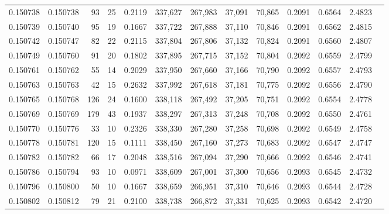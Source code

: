 \begin{tabular}{rrrrrrrrrrrrr}
0.150738 & 0.150738 &    93 &  25 &                                     0.2119 & 337,627 & 267,983 &  37,091 &  70,865 & 0.2091 & 0.6564 & 2.4823 \\
0.150739 & 0.150740 &    95 &  19 &                                     0.1667 & 337,722 & 267,888 &  37,110 &  70,846 & 0.2091 & 0.6562 & 2.4815 \\
0.150742 & 0.150747 &    82 &  22 &                                     0.2115 & 337,804 & 267,806 &  37,132 &  70,824 & 0.2091 & 0.6560 & 2.4807 \\
0.150749 & 0.150760 &    91 &  20 &                                     0.1802 & 337,895 & 267,715 &  37,152 &  70,804 & 0.2092 & 0.6559 & 2.4799 \\
0.150761 & 0.150762 &    55 &  14 &                                     0.2029 & 337,950 & 267,660 &  37,166 &  70,790 & 0.2092 & 0.6557 & 2.4793 \\
0.150763 & 0.150763 &    42 &  15 &                                     0.2632 & 337,992 & 267,618 &  37,181 &  70,775 & 0.2092 & 0.6556 & 2.4790 \\
0.150765 & 0.150768 &   126 &  24 &                                     0.1600 & 338,118 & 267,492 &  37,205 &  70,751 & 0.2092 & 0.6554 & 2.4778 \\
0.150769 & 0.150769 &   179 &  43 &                                     0.1937 & 338,297 & 267,313 &  37,248 &  70,708 & 0.2092 & 0.6550 & 2.4761 \\
0.150770 & 0.150776 &    33 &  10 &                                     0.2326 & 338,330 & 267,280 &  37,258 &  70,698 & 0.2092 & 0.6549 & 2.4758 \\
0.150778 & 0.150781 &   120 &  15 &                                     0.1111 & 338,450 & 267,160 &  37,273 &  70,683 & 0.2092 & 0.6547 & 2.4747 \\
0.150782 & 0.150782 &    66 &  17 &                                     0.2048 & 338,516 & 267,094 &  37,290 &  70,666 & 0.2092 & 0.6546 & 2.4741 \\
0.150786 & 0.150794 &    93 &  10 &                                     0.0971 & 338,609 & 267,001 &  37,300 &  70,656 & 0.2093 & 0.6545 & 2.4732 \\
0.150796 & 0.150800 &    50 &  10 &                                     0.1667 & 338,659 & 266,951 &  37,310 &  70,646 & 0.2093 & 0.6544 & 2.4728 \\
0.150802 & 0.150812 &    79 &  21 &                                     0.2100 & 338,738 & 266,872 &  37,331 &  70,625 & 0.2093 & 0.6542 & 2.4720 \\

\end{tabular}

